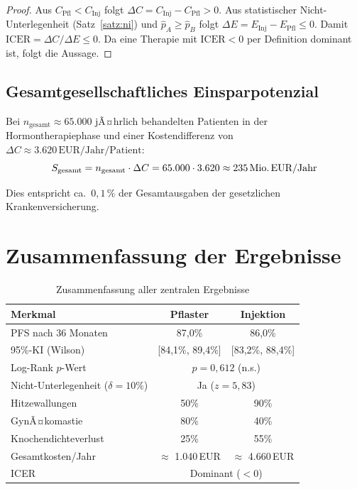 ﻿\documentclass[a4paper,12pt]{article}
\theoremstyle{definition}
\begin{document}
\begin{proof}
Aus $C_{\mathrm{Pfl}} < C_{\mathrm{Inj}}$ folgt $\Delta C = C_{\mathrm{Inj}} - C_{\mathrm{Pfl}} > 0$.
Aus statistischer Nicht-Unterlegenheit (Satz~\ref{satz:ni}) und $\hat{p}_A \geq \hat{p}_B$ folgt $\Delta E = E_{\mathrm{Inj}} - E_{\mathrm{Pfl}} \leq 0$.
Damit $\mathrm{ICER} = \Delta C / \Delta E \leq 0$. Da eine Therapie mit $\mathrm{ICER} < 0$ per Definition dominant ist, folgt die Aussage. 
\end{proof}

\subsection{Gesamtgesellschaftliches Einsparpotenzial}

Bei $n_{\mathrm{gesamt}} \approx 65.000$ jÃ¤hrlich behandelten Patienten in der Hormontherapiephase und einer Kostendifferenz von $\Delta C \approx 3.620\,\text{EUR/Jahr/Patient}$:
\begin{equation}
  S_{\mathrm{gesamt}} = n_{\mathrm{gesamt}} \cdot \Delta C = 65.000 \cdot 3.620 \approx 235\,\text{Mio.\,EUR/Jahr}
\end{equation}

Dies entspricht ca.\ $0{,}1\,\%$ der Gesamtausgaben der gesetzlichen Krankenversicherung.

\section{Zusammenfassung der Ergebnisse}

\begin{table}[h!]
\centering
\caption{Zusammenfassung aller zentralen Ergebnisse}
\label{tab:zusammenfassung}
\begin{tabular}{lcc}
\toprule
\textbf{Merkmal} & \textbf{Pflaster} & \textbf{Injektion} \\
\midrule
PFS nach 36 Monaten & 87,0\% & 86,0\% \\
95\%-KI (Wilson) & [84,1\%, 89,4\%] & [83,2\%, 88,4\%] \\
Log-Rank $p$-Wert & \multicolumn{2}{c}{$p = 0{,}612$ (n.s.)} \\
Nicht-Unterlegenheit ($\delta=10\%$) & \multicolumn{2}{c}{Ja ($z = 5{,}83$)} \\
\midrule
Hitzewallungen & 50\% & 90\% \\
GynÃ¤komastie & 80\% & 40\% \\
Knochendichteverlust & 25\% & 55\% \\
\midrule
Gesamtkosten/Jahr & $\approx$ 1.040\,EUR & $\approx$ 4.660\,EUR \\
ICER & \multicolumn{2}{c}{Dominant ($<0$)} \\
\bottomrule
\end{tabular}
\end{table}
\end{document}
